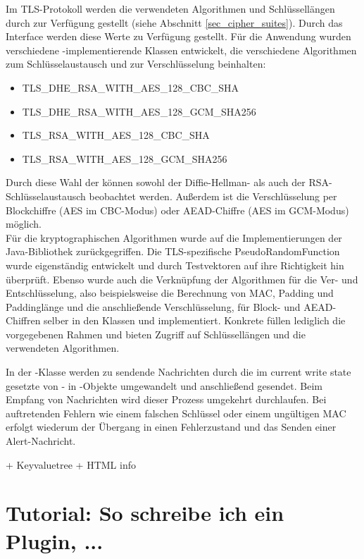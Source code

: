 Im TLS-Protokoll werden die verwendeten Algorithmen und Schlüssellängen durch \ciphersuites{} zur Verfügung gestellt (siehe Abschnitt \ref{sec_cipher_suites}). Durch das Interface  werden diese Werte zu Verfügung gestellt. Für die Anwendung wurden verschiedene -implementierende Klassen entwickelt, die verschiedene Algorithmen zum Schlüsselaustausch und zur Verschlüsselung beinhalten:
\begin{itemize}
\item TLS\_DHE\_RSA\_WITH\_AES\_128\_CBC\_SHA
\item TLS\_DHE\_RSA\_WITH\_AES\_128\_GCM\_SHA256
\item TLS\_RSA\_WITH\_AES\_128\_CBC\_SHA
\item TLS\_RSA\_WITH\_AES\_128\_GCM\_SHA256
\end{itemize}
Durch diese Wahl der \ciphersuites{} können sowohl der Diffie-Hellman- als auch der RSA-Schlüsselaustausch beobachtet werden. Außerdem ist die Verschlüsselung per Blockchiffre (AES im CBC-Modus) oder AEAD-Chiffre (AES im GCM-Modus) möglich. \\
Für die kryptographischen Algorithmen wurde auf die Implementierungen der Java-Bibliothek zurückgegriffen. Die TLS-spezifische PseudoRandomFunction wurde eigenständig entwickelt und durch Testvektoren auf ihre Richtigkeit hin überprüft. Ebenso wurde auch die Verknüpfung der Algorithmen für die Ver- und Entschlüsselung, also beispielsweise die Berechnung von MAC, Padding und Paddinglänge und die anschließende Verschlüsselung, für Block- und AEAD-Chiffren selber in den Klassen  und  implementiert. Konkrete \ciphersuites{} füllen lediglich die vorgegebenen Rahmen und bieten Zugriff auf Schlüssellängen und die verwendeten Algorithmen.

In der -Klasse werden zu sendende Nachrichten durch die im current write state gesetzte \ciphersuite{} von - in -Objekte umgewandelt und anschließend gesendet. Beim Empfang von Nachrichten wird dieser Prozess umgekehrt durchlaufen. Bei auftretenden Fehlern wie einem falschen Schlüssel oder einem ungültigen MAC erfolgt wiederum der Übergang in einen Fehlerzustand und das Senden einer Alert-Nachricht.


+ Keyvaluetree 
+ HTML info

\section{Tutorial: So schreibe ich ein Plugin, ...}
